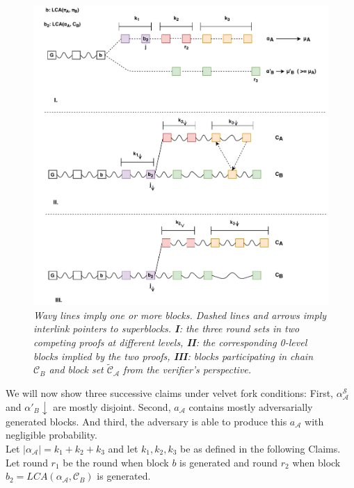 \begin{figure}[h!]
	\begin{center}
    \includegraphics[scale=0.6]{figures/proof_velvet.pdf}
	\end{center}
	\caption{\textit{ Wavy lines imply one or more blocks. Dashed lines and arrows imply
	interlink pointers to superblocks. \textbf{I}: the three round sets in two competing
	proofs at different levels, \textbf{II}: the corresponding 0-level blocks implied by the two proofs,
	\textbf{III}: blocks participating in chain $\mathcal{C}_B$ and block set $\widetilde{\mathcal{C}}_\mathcal{A}$ from the verifier's perspective.}}	
    \label{fig:proof_velvet}
\end{figure}

We will now show three successive claims under velvet fork conditions: First,
$\alpha^{\mathcal{S}}_\mathcal{A}$ and $\alpha'_B \downarrow$ are mostly
disjoint. Second, $a_\mathcal{A}$ contains mostly adversarially generated blocks. And third,
the adversary is able to produce this $a_\mathcal{A}$ with negligible probability.\\
Let $\vert \alpha_\mathcal{A} \vert = k_1 + k_2 + k_3$ and let $k_1, k_2, k_3$ be as defined in the
following Claims.\\
Let round $r_1$ be the round when block $b$ is generated and round $r_2$ when block
$b_2 = LCA(\alpha_\mathcal{A}, \mathcal{C}_B)$ is generated.\\

